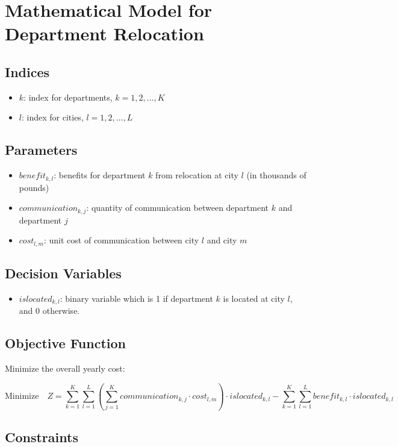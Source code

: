 \documentclass{article}
\begin{document}
\section*{Mathematical Model for Department Relocation}

\subsection*{Indices}
\begin{itemize}
    \item $k$: index for departments, $k = 1, 2, \ldots, K$
    \item $l$: index for cities, $l = 1, 2, \ldots, L$
\end{itemize}

\subsection*{Parameters}
\begin{itemize}
    \item $benefit_{k, l}$: benefits for department $k$ from relocation at city $l$ (in thousands of pounds)
    \item $communication_{k, j}$: quantity of communication between department $k$ and department $j$
    \item $cost_{l, m}$: unit cost of communication between city $l$ and city $m$
\end{itemize}

\subsection*{Decision Variables}
\begin{itemize}
    \item $islocated_{k, l}$: binary variable which is 1 if department $k$ is located at city $l$, and 0 otherwise.
\end{itemize}

\subsection*{Objective Function}
Minimize the overall yearly cost:

\[
\text{Minimize} \quad Z = \sum_{k=1}^{K} \sum_{l=1}^{L} \left( \sum_{j=1}^{K} communication_{k, j} \cdot cost_{l, m} \right) \cdot islocated_{k, l} - \sum_{k=1}^{K} \sum_{l=1}^{L} benefit_{k, l} \cdot islocated_{k, l}
\]

\subsection*{Constraints}
\end{document}
